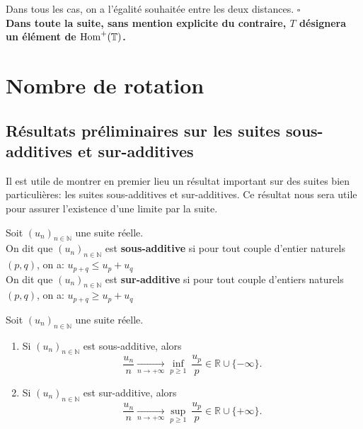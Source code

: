 	\par Dans tous les cas, on a l'égalité souhaitée entre les deux distances.
	 \hfill $\square$\\



\textbf{Dans toute la suite, sans mention explicite du contraire, $T$ désignera un élément de $\mathrm{Hom}^+({\mathbb{T}})$.}


















\section{Nombre de rotation}

\subsection{Résultats préliminaires sur les suites sous-additives et sur-additives}
Il est utile de montrer en premier lieu un résultat important sur des suites bien particulières: les suites sous-additives et sur-additives. Ce résultat nous sera utile pour assurer l'existence d'une limite par la suite.


\begin{definition}
	Soit $(u_n)_{n \in \mathbb{N}}$ une suite réelle.\\ On dit que $(u_n)_{n \in \mathbb{N}}$ est \textbf{sous-additive} si pour tout couple d'entier naturels $(p,q)$, on a: $u_{p+q} \leq u_p + u_q$\\
	On dit que $(u_n)_{n \in \mathbb{N}}$ est \textbf{sur-additive} si pour tout couple d'entiers naturels $(p, q)$, on a: $u_{p+q} \geq u_p + u_q$
\end{definition}



\begin{theorem}\label{suiteadd} Soit $(u_n)_{n \in \mathbb{N}}$ une suite réelle.
	\begin{enumerate}
		\item Si $(u_n)_{n \in \mathbb{N}}$ est sous-additive, alors
		$$\frac{u_n}{n} \underset{n \to + \infty}{\longrightarrow} \underset{p \geq 1}{\inf}\  \frac{u_p}{p} \in \mathbb{R} \cup \lbrace - \infty \rbrace.$$

		\item Si $(u_n)_{n \in \mathbb{N}}$ est sur-additive, alors
		$$\frac{u_n}{n} \underset{n \to + \infty}{\longrightarrow} \underset{p \geq 1}{\sup}\  \frac{u_p}{p}  \in \mathbb{R} \cup \lbrace + \infty \rbrace.$$
	\end{enumerate}
\end{theorem}

